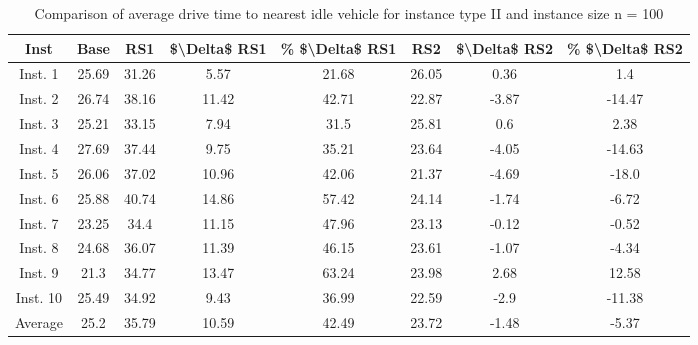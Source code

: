 \begin{table}[H]
\centering
\begin{tabular}{cccccccc}
  \hline
  \textbf{Inst} & \textbf{Base} & \textbf{RS1} & \textbf{\$\textbackslash{}Delta\$  RS1} & \textbf{\% \$\textbackslash{}Delta\$  RS1} & \textbf{RS2} & \textbf{\$\textbackslash{}Delta\$  RS2} & \textbf{\% \$\textbackslash{}Delta\$  RS2} \\\hline
  Inst. 1 & 25.69 & 31.26 & 5.57 & 21.68 & 26.05 & 0.36 & 1.4 \\
  Inst. 2 & 26.74 & 38.16 & 11.42 & 42.71 & 22.87 & -3.87 & -14.47 \\
  Inst. 3 & 25.21 & 33.15 & 7.94 & 31.5 & 25.81 & 0.6 & 2.38 \\
  Inst. 4 & 27.69 & 37.44 & 9.75 & 35.21 & 23.64 & -4.05 & -14.63 \\
  Inst. 5 & 26.06 & 37.02 & 10.96 & 42.06 & 21.37 & -4.69 & -18.0 \\
  Inst. 6 & 25.88 & 40.74 & 14.86 & 57.42 & 24.14 & -1.74 & -6.72 \\
  Inst. 7 & 23.25 & 34.4 & 11.15 & 47.96 & 23.13 & -0.12 & -0.52 \\
  Inst. 8 & 24.68 & 36.07 & 11.39 & 46.15 & 23.61 & -1.07 & -4.34 \\
  Inst. 9 & 21.3 & 34.77 & 13.47 & 63.24 & 23.98 & 2.68 & 12.58 \\
  Inst. 10 & 25.49 & 34.92 & 9.43 & 36.99 & 22.59 & -2.9 & -11.38 \\
  Average & 25.2 & 35.79 & 10.59 & 42.49 & 23.72 & -1.48 & -5.37 \\\hline
\end{tabular}
\caption{Comparison of average drive time to nearest idle vehicle for instance type II and instance size n = 100}
\label{tab:wait:resrelocation-nearest-drive-time-comparison_II_100}
\end{table}
